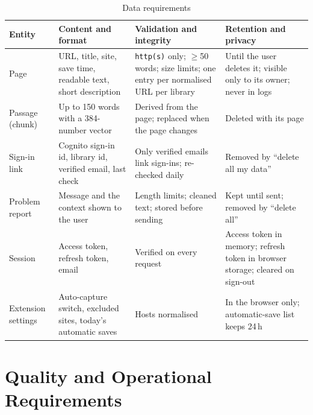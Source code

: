 \begin{table}[H]
\centering
\footnotesize
\begin{tabularx}{\textwidth}{>{\raggedright\arraybackslash}p{} L L L}
\toprule
\textbf{Entity} & \textbf{Content and format} & \textbf{Validation and integrity} & \textbf{Retention and privacy} \\
\midrule
Page & URL, title, site, save time, readable text, short description & \texttt{http(s)} only; $\geq$50 words; size limits; one entry per normalised URL per library & Until the user deletes it; visible only to its owner; never in logs \\
Passage (chunk) & Up to 150 words with a 384-number vector & Derived from the page; replaced when the page changes & Deleted with its page \\
Sign-in link & Cognito sign-in id, library id, verified email, last check & Only verified emails link sign-ins; re-checked daily & Removed by ``delete all my data'' \\
Problem report & Message and the context shown to the user & Length limits; cleaned text; stored before sending & Kept until sent; removed by ``delete all'' \\
Session & Access token, refresh token, email & Verified on every request & Access token in memory; refresh token in browser storage; cleared on sign-out \\
Extension settings & Auto-capture switch, excluded sites, today's automatic saves & Hosts normalised & In the browser only; automatic-save list keeps 24\,h \\
\bottomrule
\end{tabularx}
\caption{Data requirements}
\label{tab:datareq}
\end{table}

\section{Quality and Operational Requirements}

